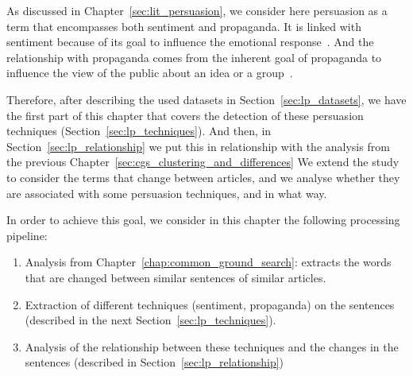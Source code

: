 As discussed in Chapter~\ref{sec:lit_persuasion}, we consider here \gls{persuasion} as a term that encompasses both \gls{sentiment} and \gls{propaganda}. %
It is linked with sentiment because of its goal to influence the emotional response~\citep{gatti2014sentiment,rocklage2018persuasion,petty2015emotion,desteno2004discrete}.
And the relationship with propaganda comes from the inherent goal of propaganda to influence the view of the public about an idea or a group~\citep{bernays,jowett2018propaganda}.



Therefore, after describing the used datasets in Section~\ref{sec:lp_datasets}, we have the first part of this chapter that covers the detection of these persuasion techniques (Section~\ref{sec:lp_techniques}).
And then, in Section~\ref{sec:lp_relationship} we put this in relationship with the analysis from the previous Chapter~\ref{sec:cgs_clustering_and_differences} %
We extend the study to consider the terms that change between articles, and we analyse whether they are associated with some persuasion techniques, and in what way. %

In order to achieve this goal, we consider in this chapter the following processing pipeline:
\begin{enumerate}
    \item Analysis from Chapter~\ref{chap:common_ground_search}: extracts the words that are changed between similar sentences of similar articles.
    \item Extraction of different techniques (sentiment, propaganda) on the sentences (described in the next Section~\ref{sec:lp_techniques}). %
    \item Analysis of the relationship between these techniques and the changes in the sentences (described in Section~\ref{sec:lp_relationship})
\end{enumerate}


